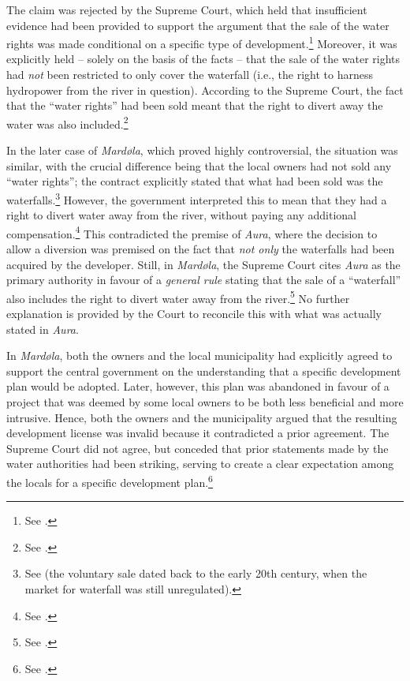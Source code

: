 The claim was rejected by the Supreme Court, which held that insufficient evidence had been provided to support the argument that the sale of the water rights was made conditional on a specific type of development.\footnote{See \cite[1285-1286]{aura61}.} Moreover, it was explicitly held -- solely on the basis of the facts -- that the sale of the water rights had {\it not} been restricted to only cover the waterfall (i.e., the right to harness hydropower from the river in question). According to the Supreme Court, the fact that the ``water rights'' had been sold meant that the right to divert away the water was also included.\footnote{See \cite[1284-1285]{aura61}.}

In the later case of {\it Mardøla}, which proved highly controversial, the situation was similar, with the crucial difference being that the local owners had not sold any ``water rights''; the contract explicitly stated that what had been sold was the waterfalls.\footnote{See \cite[112]{mardola73} (the voluntary sale dated back to the early 20th century, when the market for waterfall was still unregulated).} However, the government interpreted this to mean that they had a right to divert water away from the river, without paying any additional compensation.\footnote{See \cite[112]{mardola73}.} This contradicted the premise of {\it Aura}, where the decision to allow a diversion was premised on the fact that {\it not only} the waterfalls had been acquired by the developer. Still, in {\it Mardøla}, the Supreme Court cites {\it Aura} as the primary authority in favour of a {\it general rule} stating that the sale of a ``waterfall'' also includes the right to divert water away from the river.\footnote{See \cite[112]{mardola73}.} No further explanation is provided by the Court to reconcile this with what was actually stated in {\it Aura}.

In {\it Mardøla}, both the owners and the local municipality had explicitly agreed to support the central government on the understanding that a specific development plan would be adopted. Later, however, this plan was abandoned in favour of a project that was deemed by some local owners to be both less beneficial and more intrusive. Hence, both the owners and the municipality argued that the resulting development license was invalid because it contradicted a prior agreement. The Supreme Court did not agree, but conceded that prior statements made by the water authorities had been striking, serving to create a clear expectation among the locals for a specific development plan.\footnote{See \cite[111]{mardola73}.}

